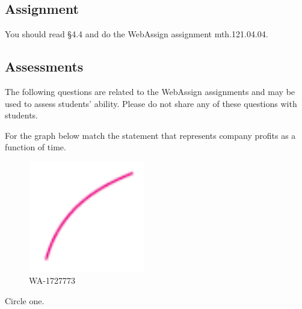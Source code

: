 \documentclass[12pt,addpoints, answers, fleqn]{exam}
\begin{document}
\subsection{Assignment}
You should read \S  4.4 and do the WebAssign assignment mth.121.04.04.
\vfill
\pagebreak
\begin{teacher}
\subsection{Assessments}
The following questions are related to the WebAssign assignments and may be used to assess students' ability. Please do not share any of these questions with students.
\begin{questions}		
\question 	%
For the graph below match the statement that represents company profits as a function of time.
\begin{figure}[htbp] %
   \centering
   \includegraphics[width=2in]{./graphics/1727773.pdf} 
   \caption{WA-1727773}
   \label{fig:1727773}
\end{figure}
Circle one.
\begin{solution}
\end{solution}
\end{questions}
\end{teacher}
\end{document}
